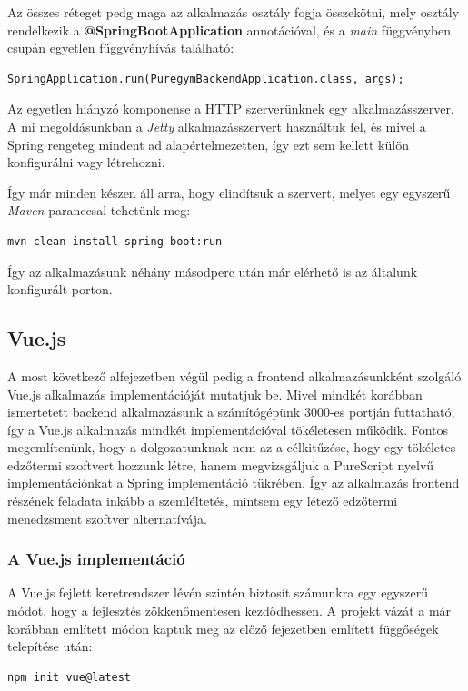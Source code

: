 \documentclass[12pt]{article}
\begin{document}
Az összes réteget pedg maga az alkalmazás osztály fogja összekötni, mely osztály rendelkezik a \textbf{@SpringBootApplication} annotációval, és a \textit{main} függvényben csupán egyetlen függvényhívás található:
\begin{verbatim}
SpringApplication.run(PuregymBackendApplication.class, args);
\end{verbatim}

Az egyetlen hiányzó komponense a HTTP szerverünknek egy alkalmazásszerver. A mi megoldásunkban a \textit{Jetty} alkalmazásszervert használtuk fel, és mivel a Spring rengeteg mindent ad alapértelmezetten, így ezt sem kellett külön konfigurálni vagy létrehozni.

Így már minden készen áll arra, hogy elindítsuk a szervert, melyet egy egyszerű \textit{Maven} paranccsal tehetünk meg:
\begin{verbatim}
mvn clean install spring-boot:run
\end{verbatim}

Így az alkalmazásunk néhány másodperc után már elérhető is az általunk konfigurált porton.

\subsection{Vue.js}

A most következő alfejezetben végül pedig a frontend alkalmazásunkként szolgáló Vue.js alkalmazás implementációját mutatjuk be. Mivel mindkét korábban ismertetett backend alkalmazásunk a számítógépünk 3000-es portján futtatható, így a Vue.js alkalmazás mindkét implementációval tökéletesen működik. Fontos megemlítenünk, hogy a dolgozatunknak nem az a célkitűzése, hogy egy tökéletes edzőtermi szoftvert hozzunk létre, hanem megvizsgáljuk a PureScript nyelvű implementációnkat a Spring implementáció tükrében. Így az alkalmazás frontend részének feladata inkább a szemléltetés, mintsem egy létező edzőtermi menedzsment szoftver alternatívája.

\subsubsection{A Vue.js implementáció}

A Vue.js fejlett keretrendszer lévén szintén biztosít számunkra egy egyszerű módot, hogy a fejlesztés zökkenőmentesen kezdődhessen. A projekt vázát a már korábban említett módon kaptuk meg az előző fejezetben említett függőségek telepítése után:
\begin{verbatim}
npm init vue@latest
\end{verbatim}
\end{document}
